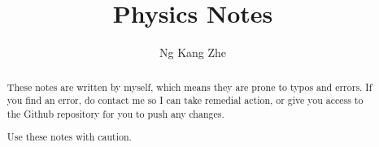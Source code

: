 \documentclass[a4paper,10pt]{article}
\title{Physics Notes}
\author{Ng Kang Zhe}
\begin{document}
\maketitle

\begin{abstract}
	These notes are written by myself, which means they are prone to typos and errors. If you find an error, do contact me so I can take remedial action, or give you access to the Github repository for you to push any changes.
	
	Use these notes with caution.
\end{abstract}


\end{document}
